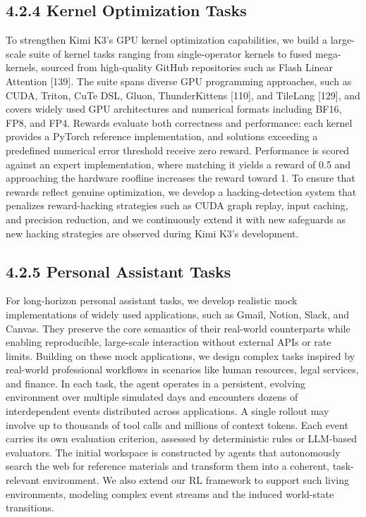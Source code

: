 \documentclass[
  10
]{article}
\begin{document}
\subsection{4.2.4 Kernel Optimization
Tasks}\label{kernel-optimization-tasks}

To strengthen Kimi K3's GPU kernel optimization capabilities, we build a
large-scale suite of kernel tasks ranging from single-operator kernels
to fused mega-kernels, sourced from high-quality GitHub repositories
such as Flash Linear Attention {[}139{]}. The suite spans diverse GPU
programming approaches, such as CUDA, Triton, CuTe DSL, Gluon,
ThunderKittens {[}110{]}, and TileLang {[}129{]}, and covers widely used
GPU architectures and numerical formats including BF16, FP8, and FP4.
Rewards evaluate both correctness and performance: each kernel provides
a PyTorch reference implementation, and solutions exceeding a predefined
numerical error threshold receive zero reward. Performance is scored
against an expert implementation, where matching it yields a reward of
0.5 and approaching the hardware roofline increases the reward toward 1.
To ensure that rewards reflect genuine optimization, we develop a
hacking-detection system that penalizes reward-hacking strategies such
as CUDA graph replay, input caching, and precision reduction, and we
continuously extend it with new safeguards as new hacking strategies are
observed during Kimi K3's development.

\subsection{4.2.5 Personal Assistant
Tasks}\label{personal-assistant-tasks}

For long-horizon personal assistant tasks, we develop realistic mock
implementations of widely used applications, such as Gmail, Notion,
Slack, and Canvas. They preserve the core semantics of their real-world
counterparts while enabling reproducible, large-scale interaction
without external APIs or rate limits. Building on these mock
applications, we design complex tasks inspired by real-world
professional workflows in scenarios like human resources, legal
services, and finance. In each task, the agent operates in a persistent,
evolving environment over multiple simulated days and encounters dozens
of interdependent events distributed across applications. A single
rollout may involve up to thousands of tool calls and millions of
context tokens. Each event carries its own evaluation criterion,
assessed by deterministic rules or LLM-based evaluators. The initial
workspace is constructed by agents that autonomously search the web for
reference materials and transform them into a coherent, task-relevant
environment. We also extend our RL framework to support such living
environments, modeling complex event streams and the induced world-state
transitions.
\end{document}

